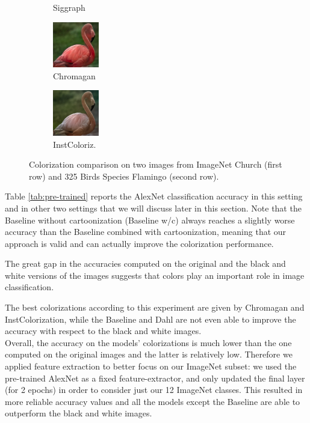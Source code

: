 \begin{figure}[t]
\begin{subfigure}[b]{0.1\textwidth}
		\caption{Siggraph}
	\end{subfigure}
	\hfill
	\begin{subfigure}[b]{0.1\textwidth}
		\includegraphics[width=2cm]{chr - flamingo.jpg}
		\caption{Chromagan}
	\end{subfigure}
	\hfill
	\begin{subfigure}[b]{0.1\textwidth}
		\includegraphics[width=2cm]{su - flamingo.png}
		\caption{InstColoriz.}
	\end{subfigure}
	\caption{{\small Colorization comparison on two images from ImageNet Church (first row) and 325 Birds Species Flamingo (second row).}}
	\label{fig:imagenet}
\end{figure}

Table \ref{tab:pre-trained} reports the AlexNet classification accuracy in this setting and in other two settings that we will discuss later in this section. Note that the Baseline without cartoonization (Baseline w/c) always reaches a slightly worse accuracy than the Baseline combined with cartoonization, meaning that our approach is valid and can actually improve the colorization performance.

The great gap in the accuracies computed on the original and the black and white versions of the images suggests that colors play an important role in image classification.

The best colorizations according to this experiment are given by Chromagan and InstColorization, while the Baseline and Dahl are not even able to improve the accuracy with respect to the black and white images.\\

Overall, the accuracy on the models' colorizations is much lower than the one computed on the original images and the latter is relatively low. Therefore we applied feature extraction to better focus on our ImageNet subset: we used the pre-trained AlexNet as a fixed feature-extractor, and only updated the final layer (for 2 epochs) in order to consider just our 12 ImageNet classes. This resulted in more reliable accuracy values and all the models except the Baseline are able to outperform the black and white images.\\

